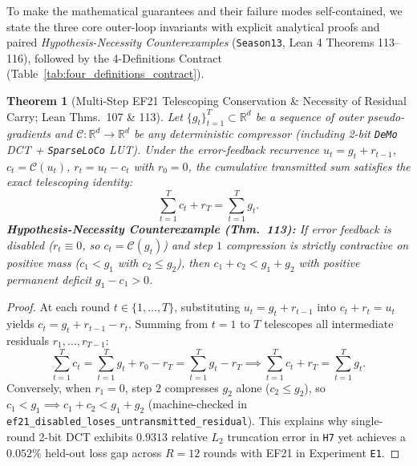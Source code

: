 \documentclass[11pt,a4paper]{article}
\newtheorem{theorem}{Theorem}[section]
\begin{document}
To make the mathematical guarantees and their failure modes self-contained, we state the three core outer-loop invariants with explicit analytical proofs and paired \emph{Hypothesis-Necessity Counterexamples} (\texttt{Season13}, Lean 4 Theorems 113--116), followed by the 4-Definitions Contract (Table~\ref{tab:four_definitions_contract}).

\begin{theorem}[Multi-Step EF21 Telescoping Conservation \& Necessity of Residual Carry; Lean Thms.\ 107 \& 113]
\label{thm:ef21_telescoping}
Let $\{g_t\}_{t=1}^T \subset \mathbb{R}^d$ be a sequence of outer pseudo-gradients and $\mathcal{C}: \mathbb{R}^d \to \mathbb{R}^d$ be any deterministic compressor (including 2-bit \texttt{DeMo} DCT + \texttt{SparseLoCo} LUT). Under the error-feedback recurrence $u_t = g_t + r_{t-1}$, $c_t = \mathcal{C}(u_t)$, $r_t = u_t - c_t$ with $r_0 = 0$, the cumulative transmitted sum satisfies the exact telescoping identity:
\begin{equation}
    \sum_{t=1}^T c_t + r_T = \sum_{t=1}^T g_t.
\end{equation}
\textbf{Hypothesis-Necessity Counterexample (Thm.\ 113):} If error feedback is disabled ($r_t \equiv 0$, so $c_t = \mathcal{C}(g_t)$) and step $1$ compression is strictly contractive on positive mass ($c_1 < g_1$ with $c_2 \le g_2$), then $c_1 + c_2 < g_1 + g_2$ with positive permanent deficit $g_1 - c_1 > 0$.
\end{theorem}
\begin{proof}
At each round $t \in \{1, \dots, T\}$, substituting $u_t = g_t + r_{t-1}$ into $c_t + r_t = u_t$ yields $c_t = g_t + r_{t-1} - r_t$. Summing from $t=1$ to $T$ telescopes all intermediate residuals $r_1, \dots, r_{T-1}$:
\[
    \sum_{t=1}^T c_t = \sum_{t=1}^T g_t + r_0 - r_T = \sum_{t=1}^T g_t - r_T \implies \sum_{t=1}^T c_t + r_T = \sum_{t=1}^T g_t.
\]
Conversely, when $r_1 = 0$, step $2$ compresses $g_2$ alone ($c_2 \le g_2$), so $c_1 < g_1 \implies c_1 + c_2 < g_1 + g_2$ (machine-checked in \texttt{ef21\_disabled\_loses\_untransmitted\_residual}). This explains why single-round 2-bit DCT exhibits $0.9313$ relative $L_2$ truncation error in \texttt{H7} yet achieves a $0.052\%$ held-out loss gap across $R=12$ rounds with EF21 in Experiment \texttt{E1}.
\end{proof}
\end{document}
